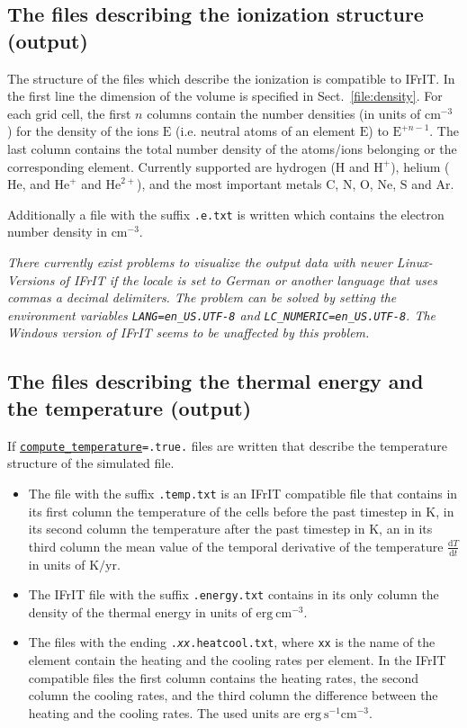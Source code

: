 \documentclass[a4paper,10pt]{article}
\begin{document}
\subsection{The files describing the ionization structure (output)}
\label{file:ionization}
The structure of the files which describe the ionization is compatible to IFrIT.
In the first line the dimension of the volume is specified in 
Sect.~\ref{file:density}. For each grid cell, the first $n$ columns contain the 
number densities (in units of $\mathrm{cm^{-3}}$ ) for the density of the ions 
$\mathrm{E}$ (i.e. neutral atoms of an element $\mathrm{E}$) to 
$\mathrm{E}^{+n-1}$. The last column contains the total number density of the 
atoms/ions belonging or the corresponding element. Currently supported are  
hydrogen ($\mathrm{H}$ and $\mathrm{H}^+$), helium  ($\mathrm{He}$, and 
$\mathrm{He}^+$ and $\mathrm{He}^{2+}$), and the most important metals 
$\mathrm{C}$, $\mathrm{N}$, $\mathrm{O}$, $\mathrm{Ne}$, $\mathrm{S}$
and $\mathrm{Ar}$.

Additionally a file with the suffix \texttt{.e.txt} is written which contains 
the electron number density in $\mathrm{cm^{-3}}$.

\textit{There currently exist problems to visualize the output  
data with newer Linux-Versions of IFrIT if the locale is set to German or 
another language that uses commas a decimal delimiters. The problem can be 
solved by setting the environment variables \texttt{LANG=en\_US.UTF-8} and
\texttt{LC\_NUMERIC=en\_US.UTF-8}. The Windows version of IFrIT seems to be 
unaffected by this problem.}


\subsection{The files describing the thermal energy and the 
temperature (output)}
\label{file:temperature}
If \texttt{\hyperref[opt:computetemperature]{compute\_temperature}=.true.}  
files are written that describe the temperature structure of the simulated 
file. 

\begin{itemize} 
\item The file with the suffix \texttt{.temp.txt} is an IFrIT compatible file 
that contains in its first column the temperature of the cells before the past 
timestep in K, in its second column the temperature after the past timestep in 
K, an in its third column the mean value of the temporal derivative of the 
temperature $\frac{\mathrm{d}T}{\mathrm{d}t}$ in units of $\mathrm{K/yr.}$ 
\item The IFrIT file with the suffix \texttt{.energy.txt} contains in its only 
column the density of the thermal energy in units of $\mathrm{erg~cm^{-3}}$. 
\item The files with the ending \texttt{.\textit{xx}.heatcool.txt}, where 
\texttt{xx} is 
the name of the element contain the heating and the cooling rates per element. 
In the IFrIT compatible files the first column contains the heating rates, the 
second column the cooling rates, and the third column the difference between 
the heating and the cooling rates. The used units are $\mathrm{erg~s^{-1} 
cm^{-3}}$.
\end{itemize}
  
\end{document}
